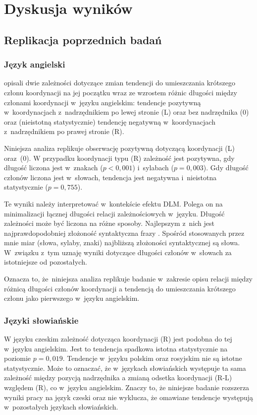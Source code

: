 \chapter{Dyskusja wyników} \label{ch6}

\section{Replikacja poprzednich badań}

\subsection{Język angielski}

\cite{przepiorkowski2023conjunct} opisali dwie zależności dotyczące zmian tendencji do umieszczania krótszego członu koordynacji na jej początku wraz ze wzrostem różnic długości między członami koordynacji w~języku angielskim: tendencje pozytywną w~koordynacjach z~nadrzędnikiem po lewej stronie (L) oraz bez nadrzędnika (0) oraz (nieistotną statystycznie) tendencję negatywną w~koordynacjach z~nadrzędnikiem po prawej stronie (R).

Niniejsza analiza replikuje obserwację pozytywną dotyczącą koordynacji (L) oraz~(0). W przypadku koordynacji typu (R) zależność jest pozytywna, gdy długość liczona jest w~znakach ($p<0{,}001$) i~sylabach ($p=0{,}003$).
Gdy długość członów liczona jest w~słowach, tendencja jest negatywna i~nieistotna statystycznie ($p=0{,}755$).

Te wyniki należy interpretować w~kontekście efektu DLM. Polega on na minimalizacji łącznej długości relacji zależnościowych w~języku. Długość zależności może być liczona na różne sposoby. Najlepszym z~nich jest najprawdopodobniej złożoność syntaktyczna frazy \citep{lohmann2014english}. Spośród stosowanych przez mnie miar (słowa, sylaby, znaki) najbliższą złożoności syntaktycznej są słowa. W~związku z~tym uznaję wyniki dotyczące długości członów w~słowach za istotniejsze od pozostałych.

Oznacza to, że~niniejsza analiza replikuje badanie \cite{przepiorkowski2023conjunct} w~zakresie opisu relacji między różnicą długości członów koordynacji a tendencją do umieszczania krótszego członu jako pierwszego w~języku angielskim.

\subsection{Języki słowiańskie}

W języku czeskim zależność dotycząca koordynacji (R) jest podobna do tej w~języku angielskim. Jest to tendencja spadkowa istotna statystycznie na poziomie $p=0{,}019$. Tendencje w~języku polskim oraz rosyjskim nie są istotne statystycznie. Może to oznaczać, że w~językach słowiańskich występuje ta sama zależność między pozycją nadrzędnika a zmianą odsetka koordynacji (R-L) względem (R), co w~języku angielskim. Znaczy to, że niniejsze badanie rozszerza wyniki pracy \cite{przepiorkowski2023conjunct} na język czeski oraz nie wyklucza, że omawiane tendencje występują w~pozostałych językach słowiańskich.

